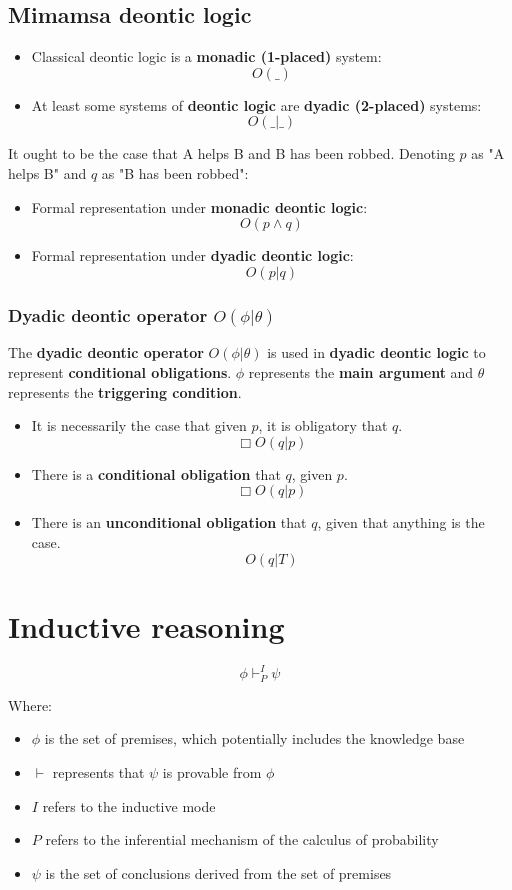 \documentclass[11pt]{article}
\begin{document}
\subsection{Mimamsa deontic logic}
\label{sec:org87c1060}
\begin{itemize}
\item Classical deontic logic is a \textbf{monadic (1-placed)} system:
\[O(\_)\]
\item At least some systems of \textbf{deontic logic} are \textbf{dyadic (2-placed)} systems:
\[O(\_ | \_)\]
\end{itemize}

It ought to be the case that A helps B and B has been robbed. Denoting \(p\) as "A helps B" and \(q\) as "B has been robbed":
\begin{itemize}
\item Formal representation under \textbf{monadic deontic logic}:
\[O(p \wedge q)\]
\item Formal representation under \textbf{dyadic deontic logic}:
\[O(p | q)\]
\end{itemize}
\subsubsection{Dyadic deontic operator \(O(\phi | \theta)\)}
\label{sec:orge4e9fc7}
The \textbf{dyadic deontic operator} \(O(\phi | \theta)\) is used in \textbf{dyadic deontic logic} to represent \textbf{conditional obligations}. \(\phi\) represents the \textbf{main argument} and \(\theta\) represents the \textbf{triggering condition}.

\begin{itemize}
\item It is necessarily the case that given \(p\), it is obligatory that \(q\).
\[\Box O (q | p)\]
\item There is a \textbf{conditional obligation} that \(q\), given \(p\).
\[\Box O (q | p)\]
\item There is an \textbf{unconditional obligation} that \(q\), given that anything is the case.
\[O (q | T)\]
\end{itemize}
\section{Inductive reasoning}
\label{sec:org07b2634}
\[\phi \vdash^{I}_{P} \psi\]

Where:
\begin{itemize}
\item \(\phi\) is the set of premises, which potentially includes the knowledge base
\item \(\vdash\) represents that \(\psi\) is provable from \(\phi\)
\item \(I\) refers to the inductive mode
\item \(P\) refers to the inferential mechanism of the calculus of probability
\item \(\psi\) is the set of conclusions derived from the set of premises
\end{itemize}
\end{document}
